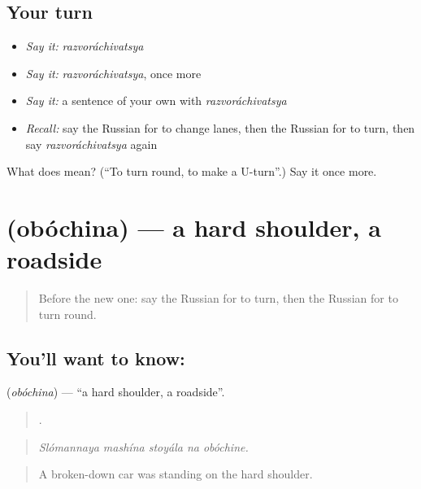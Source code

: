 \subsection*{Your turn}
\begin{itemize}
\raggedright
  \item \emph{Say it:} \emph{razvoráchivatsya}
  \item \emph{Say it:} \emph{razvoráchivatsya}, once more
  \item \emph{Say it:} a sentence of your own with \emph{razvoráchivatsya}
  \item \emph{Recall:} say the Russian for to change lanes, then the Russian for to turn, then say \emph{razvoráchivatsya} again
\end{itemize}

\begin{tcolorbox}[breakable,colback=teal!4,colframe=teal!35!black,title={Before you move on}]
What does  mean? (\textquotedblleft{}To turn round, to make a U-turn\textquotedblright{}.) Say it once more.
\end{tcolorbox}
\section[\texorpdfstring{\ru{обочина} (obóchina)}{обочина (obóchina)}]{ (obóchina) — a hard shoulder, a roadside}

\label{lesson:RU-C407-obochina}



\begin{quote}
Before the new one: say the Russian for to turn, then the Russian for to turn round.
\end{quote}

\subsection*{You'll want to know: }
\textbf{} (\emph{obóchina}) — \textquotedblleft{}a hard shoulder, a roadside\textquotedblright{}.

\begin{quote}
    .
\end{quote}

\begin{quote}
\emph{Slómannaya mashína stoyála na obóchine.}
\end{quote}

\begin{quote}
A broken-down car was standing on the hard shoulder.
\end{quote}

